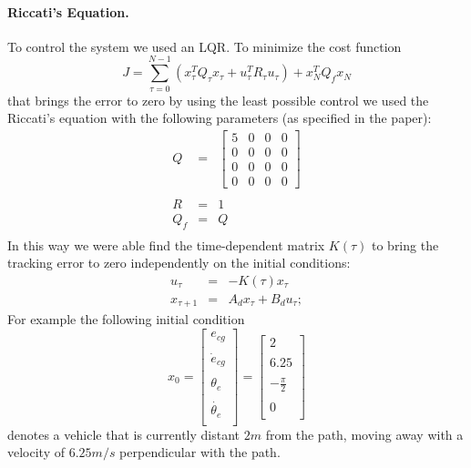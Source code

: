 \documentclass{article}
\begin{document}
\paragraph{Riccati's Equation.} To control the system we used an LQR. To minimize the cost function
$$ J = \sum_{\tau=0}^{N-1} (x_\tau^TQ_\tau x_\tau + u_\tau^TR_\tau u_\tau) + x^T_NQ_fx_N$$
that brings the error to zero by using the least possible control we used the Riccati's equation with the following parameters (as specified in the paper):
\begin{eqnarray*}
 Q &=& 
 \begin{bmatrix} 
 	5 & 0 & 0 & 0 \\
 	0 & 0 & 0 & 0\\
 	0 & 0 & 0 & 0 \\
 	0 & 0 & 0 & 0
 \end{bmatrix} \\\\
 R &=& 1 \\
 Q_f &=& Q \\
 \end{eqnarray*}
In this way we were able find the time-dependent matrix $K(\tau)$ to bring the tracking error to zero independently on the initial conditions:
\begin{eqnarray*}
	u_\tau &=& -K(\tau)x_\tau \\
	x_{\tau + 1} &=& A_dx_\tau + B_du_\tau;
\end{eqnarray*}
For example the following initial condition
$$x_0 = \begin{bmatrix} 
 	e_{cg} \\\\
 	\dot{e}_{cg} \\\\
 	\theta_e \\\\
 	\dot{\theta_e} \\
 \end{bmatrix} = \begin{bmatrix} 
 	2 \\\\
 	6.25 \\\\
 	-\frac{\pi}{2} \\\\
 	0 \\
 \end{bmatrix}$$
denotes a vehicle that is currently distant $2m$ from the path, moving away with a velocity of $6.25m/s$ perpendicular with the path. \\\\ 
\end{document}
